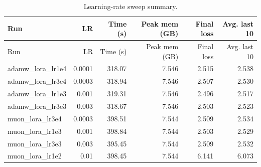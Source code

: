 \documentclass[11pt]{article}
\begin{document}
\begin{center}
\small
\begin{longtable}{lrrrrr}
\caption{Learning-rate sweep summary.} \label{tab:sweep}\\
\toprule
Run & LR & Time (s) & Peak mem (GB) & Final loss & Avg. last 10 \\
\midrule
\endfirsthead
\toprule
Run & LR & Time (s) & Peak mem (GB) & Final loss & Avg. last 10 \\
\midrule
\endhead
adamw\_lora\_lr1e4 & 0.0001 & 318.07 & 7.546 & 2.515 & 2.538 \\
adamw\_lora\_lr3e4 & 0.0003 & 318.94 & 7.546 & 2.507 & 2.530 \\
adamw\_lora\_lr1e3 & 0.001 & 319.31 & 7.546 & 2.496 & 2.517 \\
adamw\_lora\_lr3e3 & 0.003 & 318.67 & 7.546 & 2.503 & 2.523 \\
muon\_lora\_lr3e4 & 0.0003 & 398.51 & 7.544 & 2.509 & 2.534 \\
muon\_lora\_lr1e3 & 0.001 & 398.84 & 7.544 & 2.503 & 2.529 \\
muon\_lora\_lr3e3 & 0.003 & 395.45 & 7.544 & 2.509 & 2.532 \\
muon\_lora\_lr1e2 & 0.01 & 398.45 & 7.544 & 6.141 & 6.073 \\

\bottomrule
\end{longtable}
\end{center}
\end{document}
